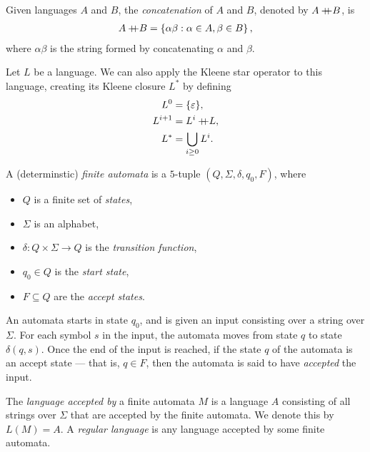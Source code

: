 \begin{defn}
    Given languages $A$ and $B$, the \emph{concatenation} of $A$ and $B$, denoted by $A +\mkern-12mu+ B$, is
    \begin{align*}
        A +\mkern-12mu+ B = \left\{\alpha\beta : \alpha \in A, \beta \in B \right\},
    \end{align*}
    where $\alpha\beta$ is the string formed by concatenating $\alpha$ and $\beta$.
\end{defn}

\begin{defn}
    Let $L$ be a language. We can also apply the Kleene star operator to this language, creating its Kleene closure $L^*$ by defining
    \begin{align*}
        L^0 &= \{\varepsilon\}, \\
        L^{i+1} &= L^{i} +\mkern-12mu+ L, \\
        L^{*} &= \bigcup_{i \geq 0}L^{i}.
    \end{align*}
\end{defn}

\begin{defn}
    A (determinstic) \emph{finite automata} is a $5$-tuple $(Q, \Sigma, \delta, q_0, F)$, where
    \begin{itemize}
        \item $Q$ is a finite set of \emph{states},
        \item $\Sigma$ is an alphabet,
        \item $\delta: Q \times \Sigma \to Q$ is the \emph{transition function},
        \item $q_0 \in Q$ is the \emph{start state},
        \item $F \subseteq Q$ are the \emph{accept states}.
    \end{itemize}
    An automata starts in state $q_0$, and is given an input consisting over a string over $\Sigma$. For each symbol $s$ in the input, the automata moves from state $q$ to state $\delta(q, s)$. Once the end of the input is reached, if the state $q$ of the automata is an accept state --- that is, $q \in F$, then the automata is said to have \emph{accepted} the input.
\end{defn}

\begin{defn}
    The \emph{language accepted by} a finite automata $M$ is a language $A$ consisting of all strings over $\Sigma$ that are accepted by the finite automata. We denote this by $L(M) = A$. A \emph{regular language} is any language accepted by some finite automata.
\end{defn}

